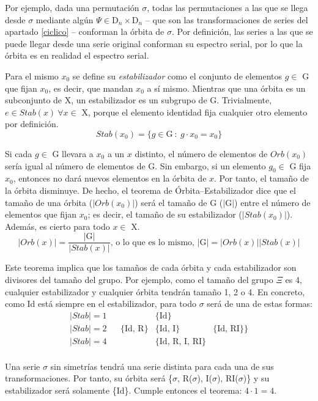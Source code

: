 		Por ejemplo, dada una permutación $\sigma$, todas las permutaciones a las que se llega desde $\sigma$ mediante algún $\Psi\in\text{D}_{n}\times\text{D}_{n}$ -- que son las transformaciones de series del apartado \ref{ciclico} -- conforman la órbita de $\sigma$. Por definición, las series a las que se puede llegar desde una serie original conforman su espectro serial, por lo que la órbita es en realidad el espectro serial.
	
		Para el mismo $x_0$ se define su \emph{estabilizador} como el conjunto de elementos $g\in$ G que fijan $x_0$, es decir, que mandan $x_0$ a sí mismo. Mientras que una órbita es un subconjunto de X, un estabilizador es un subgrupo de G. Trivialmente, $e\in Stab(x) \ \forall x\in$ X, porque el elemento identidad fija cualquier otro elemento por definición.
		$$Stab(x_0)=\{g\in \text{G}\ :\ g\cdot x_0 =x_0 \}$$
	
		Si cada $g\in$ G llevara a $x_0$ a un $x$ distinto, el número de elementos de $Orb(x_0)$ sería igual al número de elementos de G. Sin embargo, si un elemento $g_0\in$ G fija $x_0$, entonces no dará nuevos elementos en la órbita de $x$. Por tanto, el tamaño de la órbita disminuye. De hecho,  el teorema de Órbita--Estabilizador dice que el tamaño de una órbita ($|Orb(x_0)|$) será el tamaño de G ($|$G$|$) entre el número de elementos que fijan $x_0$; es decir, el tamaño de su estabilizador ($|Stab(x_0)|$). Además, es cierto para todo $x\in$ X.
		$$|Orb(x)|=\frac{|\text{G}|}{|Stab(x)|}\text{, o lo que es lo mismo, }|\text{G}|=|Orb(x)||Stab(x)|$$
		
		\def\arraystretch{1.5}
		Este teorema implica que los tamaños de cada órbita y cada estabilizador son divisores del tamaño del grupo. Por ejemplo, como el tamaño del grupo $\Xi$ es 4, cualquier estabilizador y cualquier órbita tendrán tamaño 1, 2 o 4. En concreto, como Id está siempre en el estabilizador, para  todo $\sigma$ será de una de estas formas:
		$$\begin{matrix}|Stab|=1&&&\{\text{Id}\}&\\\hline|Stab|=2&&\{\text{Id, R}\}&\{\text{Id, I}\}&\{\text{Id, RI}\}\}\\\hline|Stab|=4&&&\{\text{Id, R, I, RI}\}&\\\end{matrix}$$
		
		\def\arraystretch{1}
		Una serie $\sigma$ sin simetrías tendrá una serie distinta para cada una de sus transformaciones. Por tanto, su órbita será \{$\sigma$, R($\sigma$), I($\sigma$), RI($\sigma$)\} y su estabilizador será solamente \{Id\}. Cumple entonces el teorema: $4\cdot 1 = 4$.
	
